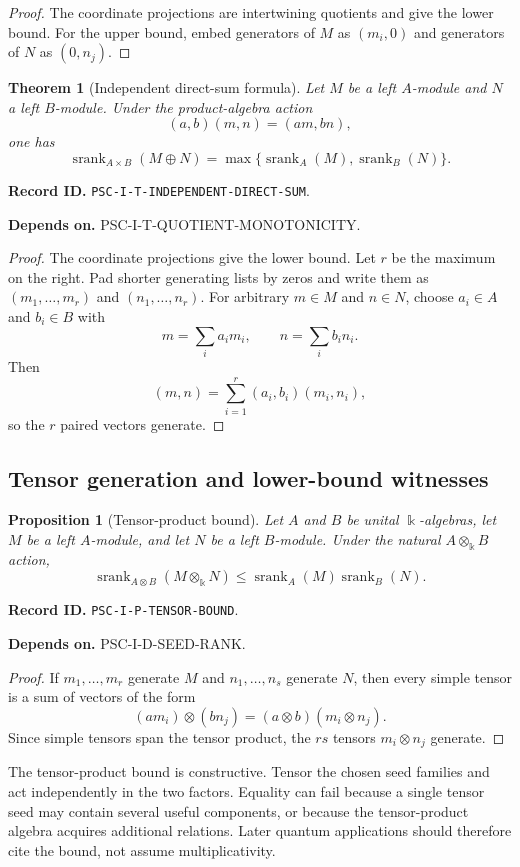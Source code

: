\documentclass[11pt]{article}
\newtheorem{theorem}{Theorem}[section]
\newtheorem{proposition}[proposition]{Proposition}
\theoremstyle{definition}
\theoremstyle{remark}
\newcommand{\bbk}{\Bbbk}
\newcommand{\srank}{\operatorname{srank}}
\newcommand{\RecordID}[1]{\par\smallskip\noindent\begingroup\footnotesize\color{PSCGray}\raggedright\textbf{Record ID.} \nolinkurl{#1}.\par\endgroup}
\newcommand{\Depends}[1]{\par\noindent\begingroup\footnotesize\color{PSCGray}\raggedright\textbf{Depends on.} #1\par\endgroup}
\begin{document}
\begin{proof}
The coordinate projections are intertwining quotients and give the lower bound.  For the upper bound, embed generators of $M$ as $(m_i,0)$ and generators of $N$ as $(0,n_j)$.
\end{proof}

\begin{theorem}[Independent direct-sum formula]
\label{thm:independent-direct-sum}
Let $M$ be a left $A$-module and $N$ a left $B$-module.  Under the product-algebra action
\[
(a,b)(m,n)=(am,bn),
\]
one has
\[
\boxed{
\srank_{A\times B}(M\oplus N)
=
\max\{\srank_A(M),\srank_B(N)\}.
}
\]
\end{theorem}
\RecordID{PSC-I-T-INDEPENDENT-DIRECT-SUM}
\Depends{PSC-I-T-QUOTIENT-MONOTONICITY.}

\begin{proof}
The coordinate projections give the lower bound.  Let $r$ be the maximum on the right.  Pad shorter generating lists by zeros and write them as $(m_1,\ldots,m_r)$ and $(n_1,\ldots,n_r)$.  For arbitrary $m\in M$ and $n\in N$, choose $a_i\in A$ and $b_i\in B$ with
\[
m=\sum_ia_im_i,
\qquad
n=\sum_ib_in_i.
\]
Then
\[
(m,n)=\sum_{i=1}^r(a_i,b_i)(m_i,n_i),
\]
so the $r$ paired vectors generate.
\end{proof}

\subsection{Tensor generation and lower-bound witnesses}
\begin{proposition}[Tensor-product bound]
\label{prop:tensor-bound}
Let $A$ and $B$ be unital $\bbk$-algebras, let $M$ be a left $A$-module, and let $N$ be a left $B$-module.  Under the natural $A\otimes_{\bbk}B$ action,
\[
\boxed{
\srank_{A\otimes B}(M\otimes_{\bbk}N)
\leq
\srank_A(M)\srank_B(N).
}
\]
\end{proposition}
\RecordID{PSC-I-P-TENSOR-BOUND}
\Depends{PSC-I-D-SEED-RANK.}

\begin{proof}
If $m_1,\ldots,m_r$ generate $M$ and $n_1,\ldots,n_s$ generate $N$, then every simple tensor is a sum of vectors of the form
\[
(am_i)\otimes(bn_j)=(a\otimes b)(m_i\otimes n_j).
\]
Since simple tensors span the tensor product, the $rs$ tensors $m_i\otimes n_j$ generate.
\end{proof}

\begin{interpretation}
The tensor-product bound is constructive.  Tensor the chosen seed families and act independently in the two factors.  Equality can fail because a single tensor seed may contain several useful components, or because the tensor-product algebra acquires additional relations.  Later quantum applications should therefore cite the bound, not assume multiplicativity.
\end{interpretation}
\end{document}
